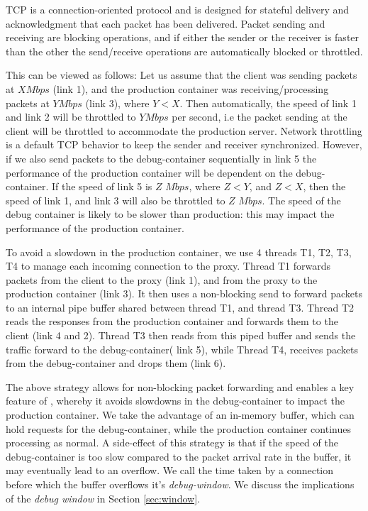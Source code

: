 TCP is a connection-oriented protocol and is designed for stateful delivery and acknowledgment that each packet has been delivered.
Packet sending and receiving are blocking operations, and if either the sender or the receiver is faster than the other the send/receive operations are automatically blocked or throttled.

This can be viewed as follows: Let us assume that the client was sending packets at $X Mbps$ (link 1), and the production container was receiving/processing packets at $Y Mbps$ (link 3), where $Y<X$. 
Then automatically, the speed of link 1 and link 2 will be throttled to $Y Mbps$ per second, i.e the packet sending at the client will be throttled to accommodate the production server. 
Network throttling is a default TCP behavior to keep the sender and receiver synchronized.
However, if we also send packets to the debug-container sequentially in link 5 the performance of the production container will be dependent on the debug-container. 
If the speed of link 5 is $Z$ $Mbps$, where $Z < Y$, and $Z < X$, then the speed of link 1, and link 3 will also be throttled to $Z$ $Mbps$.
The speed of the debug container is likely to be slower than production: this may impact the performance of the production container.

To avoid a slowdown in the production container, we use 4 threads T1, T2, T3, T4  to manage each incoming connection to the proxy.
Thread T1 forwards packets from the client to the proxy (link 1), and from the proxy to the production container (link 3). 
It then uses a non-blocking send to forward packets to an internal pipe buffer shared between thread T1, and thread T3.
Thread T2 reads the responses from the production container and forwards them to the client (link 4 and 2).
Thread T3 then reads from this piped buffer and sends the  traffic forward to the debug-container( link 5), while Thread T4, receives packets from the debug-container and drops them (link 6).

The above strategy allows for non-blocking packet forwarding and enables a key feature of \parikshan, whereby it avoids slowdowns in the debug-container to impact the production container.
We take the advantage of an in-memory buffer, which can hold requests for the debug-container, while the production container continues processing as normal.
A side-effect of this strategy is that if the speed of the debug-container is too slow compared to the packet arrival rate in the buffer, it may eventually lead to an overflow. 
We call the time taken by a connection before which the buffer overflows it's \emph{debug-window}.
We discuss the implications of the \emph{debug window} in Section \ref{sec:window}.  
